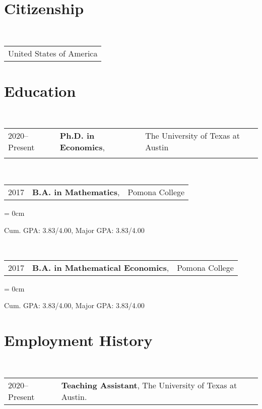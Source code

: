 \documentclass[a4paper, 11pt]{article}
\begin{document}
    \maketitle
    \thispagestyle{firststyle}
    
    \section{Citizenship}
      ~\begin{tabular}{l}
        United States of America\\
      \end{tabular}
      
    \section{Education}
      ~\begin{tabular}{lll}
        2020--Present & \textbf{Ph.D. in Economics}, & The University of Texas at Austin\\
        \vspace*{-0.50em}
      \end{tabular}

      ~\begin{tabular}{lll}
        2017 & \textbf{B.A. in Mathematics}, & Pomona College\\
      \end{tabular}
      \begin{compactitem}\parskip = 0cm
        \item Cum. GPA: 3.83/4.00, Major GPA: 3.83/4.00\\
      \end{compactitem}
      
      \vspace*{1em}
      
      ~\begin{tabular}{lll}
        2017 & \textbf{B.A. in Mathematical Economics}, & Pomona College\\
      \end{tabular}
      \begin{compactitem}\parskip = 0cm
        \item Cum. GPA: 3.83/4.00, Major GPA: 3.83/4.00\\
      \end{compactitem}
      
    \section{Employment History}
      ~\begin{tabular}{ll}
        2020--Present & \textbf{Teaching Assistant}, The University of Texas at Austin.
        \vspace*{0.75em}
      \end{tabular}
      
\end{document}
